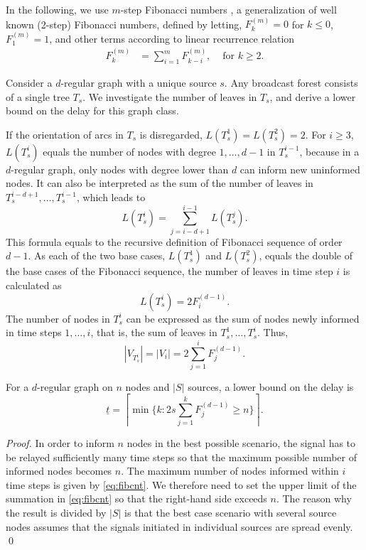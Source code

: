 In the following, we use $m$-step Fibonacci numbers \cite{noe05}, a generalization of well known (2-step) Fibonacci numbers, defined by letting, 
$F^{(m)}_k=0$ for $k\leq 0$, $F^{(m)}_1=1$, and 
other terms according to linear recurrence relation 
\begin{align*}
F^{(m)}_k &=\sum\limits_{i=1}^m F^{(m)}_{k-i}, &\text{ for } k\geq 2.
\end{align*}

Consider a $d$-regular graph with a unique source $s$.
Any broadcast forest consists of a single tree $T_s$.
We investigate the number of leaves in $T_s$, and derive a lower bound on the delay for this graph class.

If the orientation of arcs in $T_s$ is disregarded, $L(T^1_s)=L(T^2_s)=2$.
For $i\geq 3$, $L(T^i_s)$ equals the number of nodes with degree $1,\dots,d-1$ in $T^{i-1}_s$, 
because in a $d$-regular graph, only nodes with degree lower than $d$ can inform new uninformed nodes.
It can also be interpreted as the sum of the number of leaves in $T^{i-d+1}_s,\dots,T^{i-1}_s$, which leads to %
\begin{equation*}
\label{eq:leafrec}
L(T^i_s)=\sum\limits_{j=i-d+1}^{i-1} L(T^j_s).
\end{equation*}  
This formula equals to the recursive definition of Fibonacci sequence of order $d-1$.
As each of the two base cases, $L(T^1_s)$ and $L(T^2_s)$, equals the double of the base cases of the Fibonacci sequence, the number of leaves in time step $i$ is calculated as
\begin{equation*}
\label{eq:fibleaf}
L(T^i_s)=2 F^{(d-1)}_i.
\end{equation*}  
The number of nodes in $T^i_s$ can be expressed as the sum of nodes newly informed in time steps $1,\dots,i$, that is, the sum of leaves in $T^1_s,\dots,T^i_s$. Thus,
\begin{equation}
\label{eq:fibcnt}
|V_{T^i_s}|=|V_i|=2\sum\limits_{j=1}^i F^{(d-1)}_j.
\end{equation}

\begin{proposition}
For a $d$-regular graph on $n$ nodes and $|S|$ sources, a lower bound on the delay is 
\begin{equation*}
\label{lem:lbreg1}
\underline{t}=\left\lceil\min\{k:2s\sum\limits_{j=1}^k F^{(d-1)}_j\geq n\}\right\rceil.
\end{equation*}
\end{proposition}
\begin{proof}
In order to inform $n$ nodes in the best possible scenario, the signal has to be relayed sufficiently many time steps so that the maximum possible number of informed nodes becomes $n$.
The maximum number of nodes informed within $i$ time steps is given by \eqref{eq:fibcnt}.
We therefore need to set the upper limit of the summation in \eqref{eq:fibcnt} so that the right-hand side exceeds $n$.
The reason why the result is divided by $|S|$ is that the best case scenario with several source nodes assumes that the signals initiated in individual sources are spread evenly.
\qed
\end{proof}

